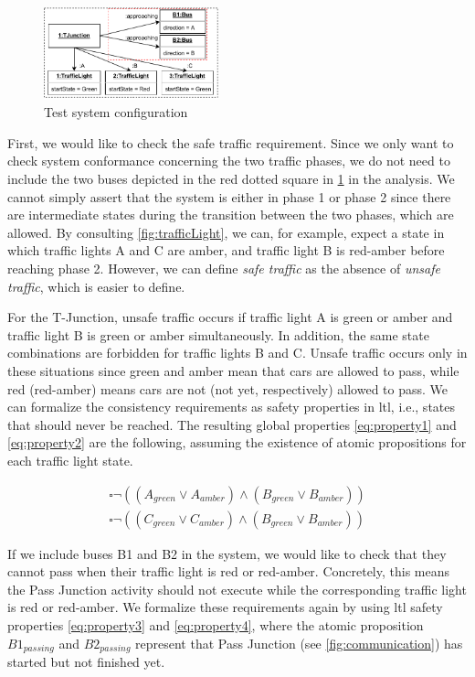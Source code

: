 \documentclass{jot}
\begin{document}
\begin{figure}[h]
    \centering
    \includegraphics[width=0.45\textwidth]{figures/test_config.pdf}
    \caption{Test system configuration}
    \label{fig:test_config}
\end{figure}

First, we would like to check the safe traffic requirement.
Since we only want to check system conformance concerning the two traffic phases, we do not need to include the two buses depicted in the red dotted square in \cref{fig:test_config} in the analysis.
We cannot simply assert that the system is either in phase 1 or phase 2 since there are intermediate states during the transition between the two phases, which are allowed.
By consulting \cref{fig:trafficLight}, we can, for example, expect a state in which traffic lights A and C are amber, and traffic light B is red-amber before reaching phase 2.
However, we can define \emph{safe traffic} as the absence of \emph{unsafe traffic}, which is easier to define.

For the T-Junction, unsafe traffic occurs if traffic light A is green or amber and traffic light B is green or amber simultaneously.
In addition, the same state combinations are forbidden for traffic lights B and C.
Unsafe traffic occurs only in these situations since green and amber mean that cars are allowed to pass, while red (red-amber) means cars are not (not yet, respectively) allowed to pass.
We can formalize the consistency requirements as safety properties in \gls*{ltl}, i.e., states that should never be reached.
The resulting global properties \eqref{eq:property1} and \eqref{eq:property2} are the following, assuming the existence of atomic propositions for each traffic light state. 

\begin{align}
    \square\neg((A_{green} \lor A_{amber}) \land (B_{green} \lor B_{amber})) \label{eq:property1} \\
    \square\neg((C_{green} \lor C_{amber}) \land (B_{green} \lor B_{amber})) \label{eq:property2}
\end{align}

If we include buses \textsf{B1} and \textsf{B2} in the system, we would like to check that they cannot pass when their traffic light is red or red-amber.
Concretely, this means the \textsf{Pass Junction} activity should not execute while the corresponding traffic light is \textsf{red} or \textsf{red-amber}.
We formalize these requirements again by using \gls*{ltl} safety properties \eqref{eq:property3} and \eqref{eq:property4}, where the atomic proposition $B1_{passing}$ and $B2_{passing}$ represent that \textsf{Pass Junction} (see \cref{fig:communication}) has started but not finished yet.
\end{document}
